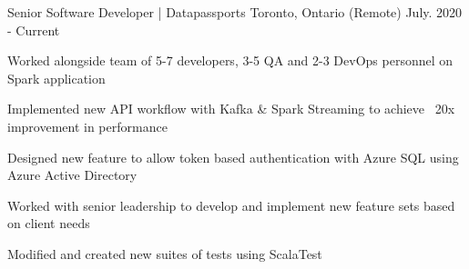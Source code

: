 \begin{cventries}

    {Senior Software Developer | Datapassports}
    {Toronto, Ontario (Remote)}
    {July. 2020 - Current}
    {
      \begin{cvitems}
	\item {Worked alongside team of 5-7 developers, 3-5 QA and 2-3 DevOps personnel on Spark application}
	\item{Implemented new API workflow with Kafka \& Spark Streaming to achieve ~20x improvement in performance}
        \item {Designed new feature to allow token based authentication with Azure SQL using Azure Active Directory}
        \item {Worked with senior leadership to develop and implement new feature sets based on client needs}
	\item {Modified and created new suites of tests using ScalaTest}
      \end{cvitems}
    }


\end{cventries}
